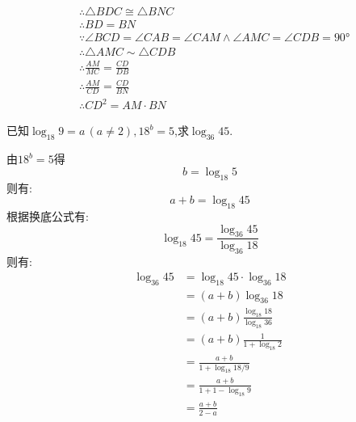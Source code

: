 \begin{questions}
\begin{proofsolution}
\begin{penum}
\begin{align*}
				       & \therefore \triangle{BDC} \cong \triangle{BNC}                                              \\
				       & \therefore BD = BN                                                                          \\
				       & \because \angle{BCD} = \angle{CAB} = \angle{CAM} \land \angle{AMC} = \angle{CDB} = \ang{90} \\
				       & \therefore \triangle{AMC} \sim \triangle{CDB}                                               \\
				       & \therefore \frac{AM}{MC} = \frac{CD}{DB}                                                    \\
				       & \therefore \frac{AM}{CD} = \frac{CD}{BN}                                                    \\
				       & \therefore CD^2 = AM\cdot BN
			      \end{align*}
		\end{penum}
	\end{proofsolution}

	\question[12] 已知$\log_{18}9=a\,(a\neq2), 18^b=5$,求$\log_{36}45$.

	\begin{solution}
		由$18^b=5$得
		\begin{equation*}
			b = \log_{18}5
		\end{equation*}
		则有:
		\begin{equation*}
			a + b = \log_{18}{45}
		\end{equation*}
		根据换底公式有:
		\begin{equation*}
			\log_{18}{45} = \frac{\log_{36}{45}}{\log_{36}{18}}
		\end{equation*}
		则有:
		\begin{align*}
			\log_{36}{45} & = \log_{18}{45}\cdot \log_{36}{18}         \\
			              & = (a+b)\log_{36}{18}                       \\
			              & = (a+b)\frac{\log_{18}{18}}{\log_{18}{36}} \\
			              & = (a+b)\frac1{1+\log_{18}2}                \\
			              & = \frac{a+b}{1+\log_{18}{18/9}}            \\
			              & = \frac{a+b}{1+1 - \log_{18}{9}}           \\
			              & = \frac{a+b}{2-a}
		\end{align*}


\end{solution}
\end{questions}
